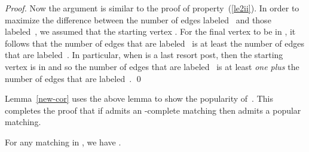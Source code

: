 \documentclass[11pt]{llncs}
\begin{document}
\begin{proof}
Now the argument is similar to the proof of property~(\ref{le2ii}). In order to maximize the difference between 
the number of edges labeled~ and those labeled~, we assumed that the starting vertex . For the 
final vertex  to be in , it follows that the number of edges that are labeled~ is at least the number 
of edges that are labeled~. In particular, when  is a last resort post, then the starting vertex is in  
and so the number of edges that are labeled~ is at least {\em one plus} the number of edges that are labeled~. \qed
\end{proof}

Lemma~\ref{new-cor} uses the above lemma to show the popularity of~. This completes the proof that if  admits an 
-complete matching then  admits a popular matching.

\begin{lemma}
\label{new-cor}
For any matching  in , we have .
\end{lemma}
\end{document}
